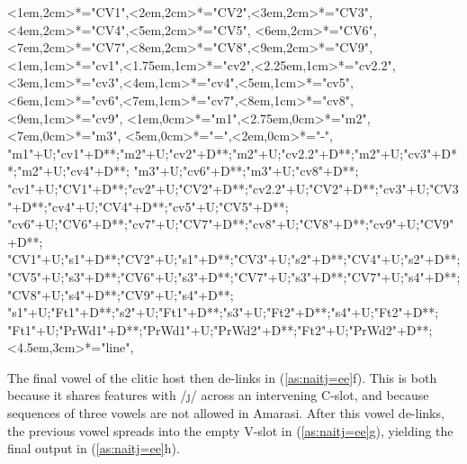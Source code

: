 \begin{multicols}{2}
\begin{exe}
{\begin{xlist}
{		<1em,2cm>*="CV1",<2em,2cm>*="CV2",<3em,2cm>*="CV3",<4em,2cm>*="CV4",<5em,2cm>*="CV5",
		<6em,2cm>*="CV6",<7em,2cm>*="CV7",<8em,2cm>*="CV8",<9em,2cm>*="CV9",
		<1em,1cm>*="cv1",<1.75em,1cm>*="cv2",<2.25em,1cm>*="cv2.2",<3em,1cm>*="cv3",<4em,1cm>*="cv4",<5em,1cm>*\as{\j}="cv5",
		<6em,1cm>*="cv6",<7em,1cm>*\as{ }="cv7",<8em,1cm>*="cv8",<9em,1cm>*\as{ }="cv9",
		<1em,0cm>*="m1",<2.75em,0cm>*="m2",<7em,0cm>*="m3",
		<5em,0cm>*\as{=}="=",<2em,0cm>*\as{-}="-",
		"m1"+U;"cv1"+D**\dir{-};"m2"+U;"cv2"+D**\dir{-};"m2"+U;"cv2.2"+D**\dir{-};"m2"+U;"cv3"+D**\dir{-};"m2"+U;"cv4"+D**\dir{-};
		"m3"+U;"cv6"+D**\dir{-};"m3"+U;"cv8"+D**\dir{-};
		"cv1"+U;"CV1"+D**\dir{-};"cv2"+U;"CV2"+D**\dir{-};"cv2.2"+U;"CV2"+D**\dir{-};"cv3"+U;"CV3"+D**\dir{-};"cv4"+U;"CV4"+D**\dir{-};"cv5"+U;"CV5"+D**\dir{-};
		"cv6"+U;"CV6"+D**\dir{-};"cv7"+U;"CV7"+D**\dir{};"cv8"+U;"CV8"+D**\dir{-};"cv9"+U;"CV9"+D**\dir{};
		"CV1"+U;"s1"+D**\dir{-};"CV2"+U;"s1"+D**\dir{-};"CV3"+U;"s2"+D**\dir{-};"CV4"+U;"s2"+D**\dir{-};
		"CV5"+U;"s3"+D**\dir{-};"CV6"+U;"s3"+D**\dir{-};"CV7"+U;"s3"+D**\dir{-};"CV7"+U;"s4"+D**\dir{-};"CV8"+U;"s4"+D**\dir{-};"CV9"+U;"s4"+D**\dir{-};
		"s1"+U;"Ft1"+D**\dir{-};"s2"+U;"Ft1"+D**\dir{-};"s3"+U;"Ft2"+D**\dir{-};"s4"+U;"Ft2"+D**\dir{-};
		"Ft1"+U;"PrWd1"+D**\dir{-};"PrWd1"+U;"PrWd2"+D**\dir{-};"Ft2"+U;"PrWd2"+D**\dir{-};
		<4.5em,3cm>*="line",
	\endxy}
	\end{xlist}}
\end{exe}
\end{multicols}

The final vowel of the clitic host then de-links in (\ref{as:naitj=ee}f).
This is both because it shares features with /\j/ across an intervening C-slot,
and because sequences of three vowels are not allowed in Amarasi.
After this vowel de-links, the previous vowel spreads into the empty V-slot in (\ref{as:naitj=ee}g),
yielding the final output in (\ref{as:naitj=ee}h).

